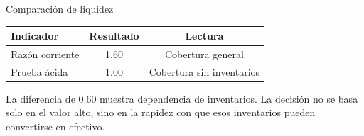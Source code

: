 \begin{frame}{Comparación de liquidez}
\begin{center}
\begin{tabular}{lcc}
\toprule
Indicador & Resultado & Lectura \\
\midrule
Razón corriente & 1.60 & Cobertura general \\
Prueba ácida & 1.00 & Cobertura sin inventarios \\
\bottomrule
\end{tabular}
\end{center}
\vspace{0.5em}
La diferencia de 0.60 muestra dependencia de inventarios. La decisión no se basa solo en el valor alto, sino en la rapidez con que esos inventarios pueden convertirse en efectivo.
\end{frame}
